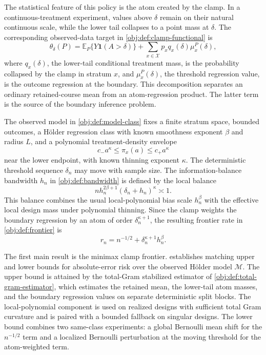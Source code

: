 The statistical feature of this policy is the atom created by the clamp. In a continuous-treatment experiment, values above \(\delta\) remain on their natural continuous scale, while the lower tail collapses to a point mass at \(\delta\). The corresponding observed-data target in \cref{obj:def:clamp-functional} is
\[
\theta_\delta(P)
=
\mathbb E_P\{Y\mathbf 1(A>\delta)\}
+
\sum_{x\in\mathcal X}p_xq_x(\delta)\mu_x^P(\delta),
\]
where \(q_x(\delta)\), the lower-tail conditional treatment mass, is the probability collapsed by the clamp in stratum \(x\), and \(\mu_x^P(\delta)\), the threshold regression value, is the outcome regression at the boundary. This decomposition separates an ordinary retained-course mean from an atom-regression product. The latter term is the source of the boundary inference problem.

The observed model in \cref{obj:def:model-class} fixes a finite stratum space, bounded outcomes, a Hölder regression class with known smoothness exponent \(\beta\) and radius \(L\), and a polynomial treatment-density envelope
\[
c_-a^\kappa\leq \pi_x(a)\leq c_+a^\kappa
\]
near the lower endpoint, with known thinning exponent \(\kappa\). The deterministic threshold sequence \(\delta_n\) may move with sample size. The information-balance bandwidth \(h_n\) in \cref{obj:def:bandwidth} is defined by the local balance
\[
n h_n^{2\beta+1}(\delta_n+h_n)^\kappa\asymp1.
\]
This balance combines the usual local-polynomial bias scale \(h_n^\beta\) with the effective local design mass under polynomial thinning. Since the clamp weights the boundary regression by an atom of order \(\delta_n^{\kappa+1}\), the resulting frontier rate in \cref{obj:def:frontier} is
\[
r_n=n^{-1/2}+\delta_n^{\kappa+1}h_n^\beta.
\]

The first main result is the minimax clamp frontier.  establishes matching upper and lower bounds for absolute-error risk over the observed Hölder model \(\mathcal M\). The upper bound is attained by the total-Gram stabilized estimator of \cref{obj:def:total-gram-estimator}, which estimates the retained mean, the lower-tail atom masses, and the boundary regression values on separate deterministic split blocks. The local-polynomial component is used on realized designs with sufficient total Gram curvature and is paired with a bounded fallback on singular designs. The lower bound combines two same-class experiments: a global Bernoulli mean shift for the \(n^{-1/2}\) term and a localized Bernoulli perturbation at the moving threshold for the atom-weighted term.

